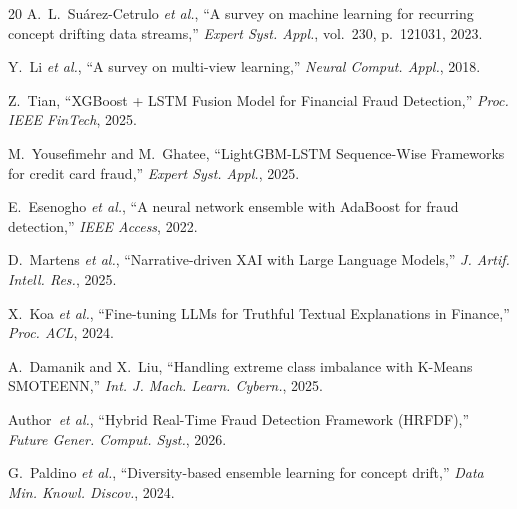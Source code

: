 \documentclass[10pt,a4paper,twocolumn]{article}
\begin{document}
{\begin{thebibliography}{20}
A.~L.~Su{\'a}rez-Cetrulo \textit{et al.}, ``A survey on machine learning for recurring concept drifting data streams,'' \textit{Expert Syst. Appl.}, vol.~230, p.~121031, 2023.

Y.~Li \textit{et al.}, ``A survey on multi-view learning,'' \textit{Neural Comput. Appl.}, 2018.

Z.~Tian, ``XGBoost + LSTM Fusion Model for Financial Fraud Detection,'' \textit{Proc. IEEE FinTech}, 2025.

M.~Yousefimehr and M.~Ghatee, ``LightGBM-LSTM Sequence-Wise Frameworks for credit card fraud,'' \textit{Expert Syst. Appl.}, 2025.

E.~Esenogho \textit{et al.}, ``A neural network ensemble with AdaBoost for fraud detection,'' \textit{IEEE Access}, 2022.

D.~Martens \textit{et al.}, ``Narrative-driven XAI with Large Language Models,'' \textit{J. Artif. Intell. Res.}, 2025.

X.~Koa \textit{et al.}, ``Fine-tuning LLMs for Truthful Textual Explanations in Finance,'' \textit{Proc. ACL}, 2024.

A.~Damanik and X.~Liu, ``Handling extreme class imbalance with K-Means SMOTEENN,'' \textit{Int. J. Mach. Learn. Cybern.}, 2025.

Author~\textit{et al.}, ``Hybrid Real-Time Fraud Detection Framework (HRFDF),'' \textit{Future Gener. Comput. Syst.}, 2026.

G.~Paldino \textit{et al.}, ``Diversity-based ensemble learning for concept drift,'' \textit{Data Min. Knowl. Discov.}, 2024.

\end{thebibliography}
}
\end{document}
